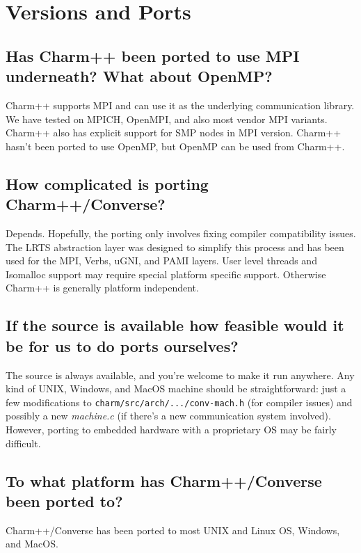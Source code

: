 \section{Versions and Ports}

\subsection{Has Charm++ been ported to use MPI underneath? What about OpenMP?}

Charm++ supports MPI and can use it as the underlying communication
library. We have tested on MPICH, OpenMPI, and also most vendor MPI
variants.  Charm++ also has explicit support for SMP nodes in MPI
version. Charm++ hasn't been ported to use OpenMP, but OpenMP can be
used from Charm++.

\subsection{How complicated is porting Charm++/Converse?}

Depends. Hopefully, the porting only involves fixing compiler compatibility
issues.  The LRTS abstraction layer was designed to simplify this process and has been used for the
MPI, Verbs, uGNI, and PAMI layers.  User level threads and Isomalloc support may require special
platform specific support.  Otherwise Charm++ is generally platform independent.

\subsection{If the source is available how feasible would it be for us to do ports
ourselves?}

The source is always available, and you're welcome to make it run anywhere.
Any kind of UNIX, Windows, and MacOS machine should be straightforward: just a
few modifications to {\tt charm/src/arch/.../conv-mach.h} (for compiler
issues) and possibly
a new {\em machine.c} (if there's a new communication system involved).
However, porting to embedded hardware with a proprietary OS may be fairly difficult.

\subsection{To what platform has Charm++/Converse been ported to?}

Charm++/Converse has been ported to most UNIX and Linux OS, Windows, and MacOS.

